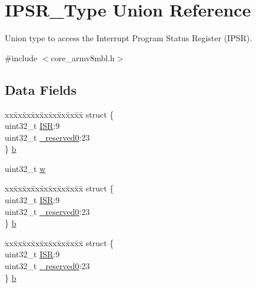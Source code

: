 \hypertarget{union_i_p_s_r___type}{}\section{I\+P\+S\+R\+\_\+\+Type Union Reference}
\label{union_i_p_s_r___type}


Union type to access the Interrupt Program Status Register (I\+P\+SR).  




{\ttfamily \#include $<$core\+\_\+armv8mbl.\+h$>$}

\subsection*{Data Fields}
\begin{DoxyCompactItemize}
\item 
\begin{tabbing}
xx\=xx\=xx\=xx\=xx\=xx\=xx\=xx\=xx\=\kill
struct \{\\
\>uint32\_t \mbox{\hyperlink{union_i_p_s_r___type_ad502ba7dbb2aab5f87c782b28f02622d}{ISR}}:9\\
\>uint32\_t \mbox{\hyperlink{union_i_p_s_r___type_ac8a6a13838a897c8d0b8bc991bbaf7c1}{\_reserved0}}:23\\
\} \mbox{\hyperlink{union_i_p_s_r___type_ac78a2f62a59b035eeb9bca6f21db4279}{b}}\\

\end{tabbing}\item 
uint32\+\_\+t \mbox{\hyperlink{union_i_p_s_r___type_ad0fb62e7a08e70fc5e0a76b67809f84b}{w}}
\item 
\begin{tabbing}
xx\=xx\=xx\=xx\=xx\=xx\=xx\=xx\=xx\=\kill
struct \{\\
\>uint32\_t \mbox{\hyperlink{union_i_p_s_r___type_ad502ba7dbb2aab5f87c782b28f02622d}{ISR}}:9\\
\>uint32\_t \mbox{\hyperlink{union_i_p_s_r___type_ac8a6a13838a897c8d0b8bc991bbaf7c1}{\_reserved0}}:23\\
\} \mbox{\hyperlink{union_i_p_s_r___type_abb1de09b2a281d7b1020caf60a21c481}{b}}\\

\end{tabbing}\item 
\begin{tabbing}
xx\=xx\=xx\=xx\=xx\=xx\=xx\=xx\=xx\=\kill
struct \{\\
\>uint32\_t \mbox{\hyperlink{union_i_p_s_r___type_ad502ba7dbb2aab5f87c782b28f02622d}{ISR}}:9\\
\>uint32\_t \mbox{\hyperlink{union_i_p_s_r___type_ac8a6a13838a897c8d0b8bc991bbaf7c1}{\_reserved0}}:23\\
\} \mbox{\hyperlink{union_i_p_s_r___type_ab9848dd5f16fe15c5001ed41059eaf39}{b}}\\

\end{tabbing}\end{DoxyCompactItemize}


